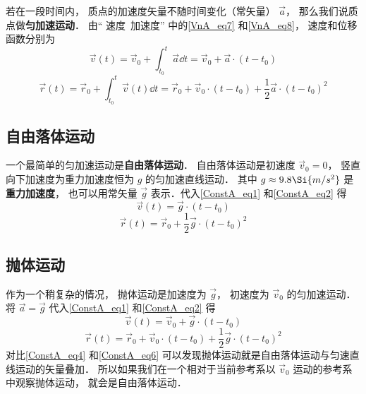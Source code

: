 

若在一段时间内， 质点的加速度矢量不随时间变化（常矢量） $\vec a$， 那么我们说质点做\textbf{匀加速运动}． 由“ 速度\ 加速度” 中的\autoref{VnA_eq7} 和\autoref{VnA_eq8}， 速度和位移函数分别为
\begin{equation}\label{ConstA_eq1}
\vec v(t) = \vec v_0 + \int_{t_0}^{t} \vec a \dd{t} = \vec v_0 + \vec a \cdot (t-t_0)
\end{equation}
\begin{equation}\label{ConstA_eq2}
\vec r(t) = \vec r_0 + \int_{t_0}^{t} \vec v(t) \dd{t} = \vec r_0 + \vec v_0\cdot (t-t_0) + \frac 12 \vec a\cdot (t-t_0)^2
\end{equation}




\subsection{自由落体运动}
一个最简单的匀加速运动是\textbf{自由落体运动}． 自由落体运动是初速度 $\vec v_0 = 0$， 竖直向下加速度为重力加速度恒为 $g$ 的匀加速直线运动． 其中 $g\approx 9.8\Si{m/s^2}$ 是\textbf{重力加速度}， 也可以用常矢量 $\vec g$ 表示．代入\autoref{ConstA_eq1} 和\autoref{ConstA_eq2} 得
\begin{equation}\label{ConstA_eq3}
\vec v(t) = \vec g \cdot (t-t_0)
\end{equation}
\begin{equation}\label{ConstA_eq4}
\vec r(t) = \vec r_0 + \frac 12 \vec g \cdot (t-t_0)^2
\end{equation}

\subsection{抛体运动}
作为一个稍复杂的情况， 抛体运动是加速度为 $\vec g$， 初速度为 $\vec v_0$ 的匀加速运动． 将 $\vec a = \vec g$ 代入\autoref{ConstA_eq1} 和\autoref{ConstA_eq2} 得
\begin{equation}\label{ConstA_eq5}
\vec v(t) = \vec v_0 + \vec g \cdot (t-t_0)
\end{equation}
\begin{equation}\label{ConstA_eq6}
\vec r(t) = \vec r_0 + \vec v_0\cdot (t-t_0) + \frac 12 \vec g\cdot (t-t_0)^2
\end{equation}
对比\autoref{ConstA_eq4} 和\autoref{ConstA_eq6} 可以发现抛体运动就是自由落体运动与匀速直线运动的矢量叠加． 所以如果我们在一个相对于当前参考系以 $\vec v_0$ 运动的参考系中观察抛体运动， 就会是自由落体运动．

